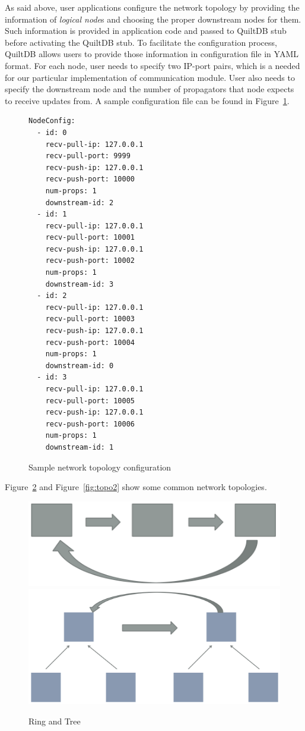 \documentclass[11pt, twocolumn]{article}
\begin{document}
As said above, user applications configure the network topology by providing the information
of \emph{logical node}s and choosing the proper downstream nodes for them. Such 
information is provided in application code and passed to QuiltDB stub before 
activating the QuiltDB stub. To facilitate the configuration process, QuiltDB 
allows users to provide those information in configuration file in YAML format.
For each node, user needs to specify two IP-port pairs, which is a needed for 
our particular implementation of communication module. User also needs to 
specify the downstream node and the number of propagators that node expects to 
receive updates from. A sample configuration file can be found in 
Figure~\ref{fig:sample-config}.

\begin{figure}[th!]
  \centering
  \label{fig:sample-config}
\begin{lstlisting}
NodeConfig:
  - id: 0
    recv-pull-ip: 127.0.0.1
    recv-pull-port: 9999
    recv-push-ip: 127.0.0.1
    recv-push-port: 10000
    num-props: 1
    downstream-id: 2
  - id: 1
    recv-pull-ip: 127.0.0.1
    recv-pull-port: 10001
    recv-push-ip: 127.0.0.1
    recv-push-port: 10002
    num-props: 1
    downstream-id: 3
  - id: 2
    recv-pull-ip: 127.0.0.1
    recv-pull-port: 10003
    recv-push-ip: 127.0.0.1
    recv-push-port: 10004
    num-props: 1
    downstream-id: 0
  - id: 3
    recv-pull-ip: 127.0.0.1
    recv-pull-port: 10005
    recv-push-ip: 127.0.0.1
    recv-push-port: 10006
    num-props: 1
    downstream-id: 1
\end{lstlisting}
  \caption{Sample network topology configuration}
\end{figure}

Figure~\ref{fig:topo1} and Figure~\ref{fig:topo2} show some common network
topologies.

\begin{figure}[th!]
  \centering
  \includegraphics[width=.4\textwidth]{fig/ring}
  \hspace{4ex}
  \includegraphics[width=.4\textwidth]{fig/tree}
  \caption{Ring and Tree}
  \label{fig:topo1}
\end{figure}
\end{document}

